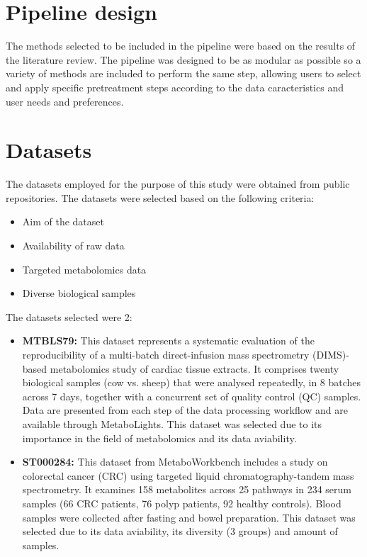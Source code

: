\documentclass[ENG, BIB]{TFUOC}%
\begin{document}
\section{Pipeline design}
The methods selected to be included in the pipeline were based on the results of the literature review. The pipeline was designed to be as modular as possible so a variety of methods are included to perform the same step, allowing users to select and apply specific pretreatment steps according to the data caracteristics and user needs and preferences.

\section{Datasets}
The datasets employed for the purpose of this study were obtained from public repositories. The datasets were selected based on the following criteria:
\begin{itemize}
    \item Aim of the dataset
    \item Availability of raw data
    \item Targeted metabolomics data
    \item Diverse biological samples
\end{itemize}

The datasets selected were 2:
\begin{itemize}
    \item \textbf{MTBLS79:} \cite{kirwanDirectInfusionMass2014} This dataset represents a systematic evaluation of the reproducibility of a multi-batch direct-infusion mass spectrometry (DIMS)-based metabolomics study of cardiac tissue extracts. It comprises twenty biological samples (cow vs. sheep) that were analysed repeatedly, in 8 batches across 7 days, together with a concurrent set of quality control (QC) samples. Data are presented from each step of the data processing workflow and are available through MetaboLights. This dataset was selected due to its importance in the field of metabolomics and its data aviability.
    \item \textbf{ST000284:} \cite{zhuColorectalCancerDetection2014} This dataset from MetaboWorkbench includes a study on colorectal cancer (CRC) using targeted liquid chromatography-tandem mass spectrometry. It examines 158 metabolites across 25 pathways in 234 serum samples (66 CRC patients, 76 polyp patients, 92 healthy controls). Blood samples were collected after fasting and bowel preparation. This dataset was selected due to its data aviability, its diversity (3 groups) and amount of samples.
    
\end{itemize}
\end{document}
